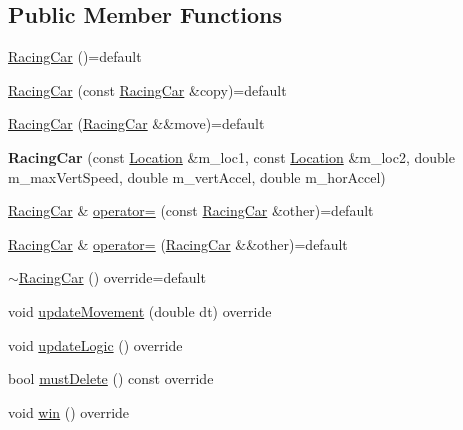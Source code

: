 \subsection*{Public Member Functions}
\begin{DoxyCompactItemize}
\item 
\hyperlink{classroadfighter_1_1RacingCar_ad36c66bdc36a849289d42b5061be2572}{Racing\+Car} ()=default
\item 
\hyperlink{classroadfighter_1_1RacingCar_ad69732f995ae7a2ee44315cd6a3fc69a}{Racing\+Car} (const \hyperlink{classroadfighter_1_1RacingCar}{Racing\+Car} \&copy)=default
\item 
\hyperlink{classroadfighter_1_1RacingCar_aacfc42aa87c6b5db3f4b80f8fbc68c74}{Racing\+Car} (\hyperlink{classroadfighter_1_1RacingCar}{Racing\+Car} \&\&move)=default
\item 
\mbox{\label{classroadfighter_1_1RacingCar_a10f2b7ee84e6859a72bccf1b922fc7f2}} 
{\bfseries Racing\+Car} (const \hyperlink{classroadfighter_1_1Location}{Location} \&m\+\_\+loc1, const \hyperlink{classroadfighter_1_1Location}{Location} \&m\+\_\+loc2, double m\+\_\+max\+Vert\+Speed, double m\+\_\+vert\+Accel, double m\+\_\+hor\+Accel)
\item 
\hyperlink{classroadfighter_1_1RacingCar}{Racing\+Car} \& \hyperlink{classroadfighter_1_1RacingCar_a2df3fdffc4c55aa85a6d9265913aa7b0}{operator=} (const \hyperlink{classroadfighter_1_1RacingCar}{Racing\+Car} \&other)=default
\item 
\hyperlink{classroadfighter_1_1RacingCar}{Racing\+Car} \& \hyperlink{classroadfighter_1_1RacingCar_a370fa9acf725d13ecb5b96ccce61b9d3}{operator=} (\hyperlink{classroadfighter_1_1RacingCar}{Racing\+Car} \&\&other)=default
\item 
\hyperlink{classroadfighter_1_1RacingCar_a1ae41bc99dca96cde8187f4ba2172ea7}{$\sim$\+Racing\+Car} () override=default
\item 
void \hyperlink{classroadfighter_1_1RacingCar_a2e8f3c63381a1fe432cddcc1f34fb935}{update\+Movement} (double dt) override
\item 
void \hyperlink{classroadfighter_1_1RacingCar_af3f3b4c368ba61c13dc9b99004895c5d}{update\+Logic} () override
\item 
bool \hyperlink{classroadfighter_1_1RacingCar_a300bccb330cc8e84834edd5f85354a10}{must\+Delete} () const override
\item 
void \hyperlink{classroadfighter_1_1RacingCar_a24293ac56920da01d29fe99aee8d3ea6}{win} () override

\end{DoxyCompactItemize}
